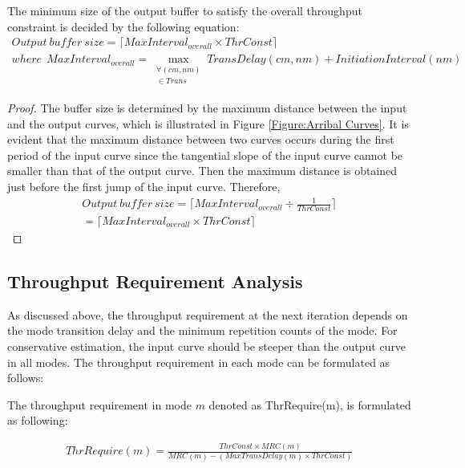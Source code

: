 \documentclass[prodmode,acmtecs]{acmsmall}
\begin{document}
\begin{theorem}  The minimum size of the output buffer to satisfy the overall throughput constraint is decided by the following equation:
\label{Theorem:Output Buffer Size}
\begin{gather*}
Output \: buffer \: size = \lceil MaxInterval_{overall} \times ThrConst \rceil
\\ where \:\:MaxInterval_{overall} = \max_{\substack{\forall (cm, nm) \\ \in Trans}} TransDelay(cm, nm) + InitiationInterval(nm) \nonumber
\end{gather*}
\end{theorem}

\begin{proof}
The buffer size is determined by the maximum distance between the input and the output curves, which is illustrated in Figure \ref{Figure:Arribal Curves}. It is evident that the maximum distance between two curves occurs during the first period of the input curve since the tangential slope of the input curve cannot be smaller than that of the output curve. Then the maximum distance is obtained just before the first jump of the input curve. Therefore,
\begin{equation}
\begin{split}
Output \: buffer \: size = \lceil MaxInterval_{overall} \div \frac{1}{ThrConst} \rceil \\ = \lceil MaxInterval_{overall} \times ThrConst \rceil \nonumber
\end{split}
\end{equation}
\end{proof}

\subsection{Throughput Requirement Analysis}
\label{SubSection:Throughput Requirement Analysis}

As discussed above, the throughput requirement at the next iteration depends on the mode transition delay and the minimum repetition counts of the mode. For conservative estimation, the input curve should be steeper than the output curve in all modes. The throughput requirement in each mode can be formulated as follows:

\begin{theorem}  The throughput requirement in mode $m$
denoted as ThrRequire(m), is formulated as following:

\label{Theorem:Throughput Requirement}
\begin{gather*}
ThrRequire(m) = \frac{ThrConst \times MRC(m)}{MRC(m) - (MaxTransDelay(m) \times ThrConst)}  \nonumber
\end{gather*}
\end{theorem}
\end{document}
